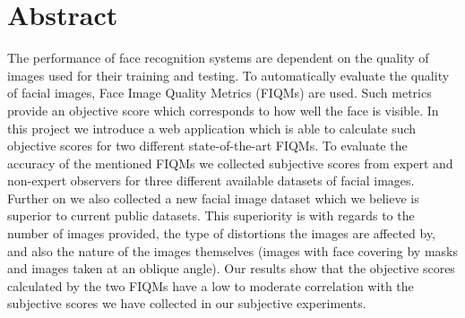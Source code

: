 \chapter*{Abstract}
The performance of face recognition systems are dependent on the quality of images used for their training and testing. To automatically evaluate the quality of facial images, Face Image Quality Metrics (FIQMs) are used. Such metrics provide an objective score which corresponds to how well the face is visible. In this project we introduce a web application which is able to calculate such objective scores for two different state-of-the-art FIQMs. To evaluate the accuracy of the mentioned FIQMs we collected subjective scores from expert and non-expert observers for three different available datasets of facial images. Further on we also collected a new facial image dataset which we believe is superior to current public datasets. This superiority is with regards to the number of images provided, the type of distortions the images are affected by, and also the nature of the images themselves (images with face covering by masks and images taken at an oblique angle). Our results show that the objective scores calculated by the two FIQMs have a low to moderate correlation with the subjective scores we have collected in our subjective experiments.



